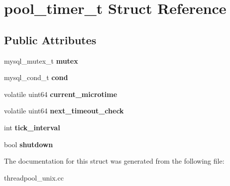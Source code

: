 \hypertarget{structpool__timer__t}{}\section{pool\+\_\+timer\+\_\+t Struct Reference}
\label{structpool__timer__t}
\subsection*{Public Attributes}
\begin{DoxyCompactItemize}
\item 
\mbox{\label{structpool__timer__t_a039774a357f5d3cad96cf047763341d1}} 
mysql\+\_\+mutex\+\_\+t {\bfseries mutex}
\item 
\mbox{\label{structpool__timer__t_ab10360d7d9d2e632e5c32f5cd214855c}} 
mysql\+\_\+cond\+\_\+t {\bfseries cond}
\item 
\mbox{\label{structpool__timer__t_afc1631b7af411289ffcfe05a82974465}} 
volatile uint64 {\bfseries current\+\_\+microtime}
\item 
\mbox{\label{structpool__timer__t_a70327fcc8842fa022200f41470c6ea21}} 
volatile uint64 {\bfseries next\+\_\+timeout\+\_\+check}
\item 
\mbox{\label{structpool__timer__t_aa7471bfac1ba5b2fb7867248c34dc89f}} 
int {\bfseries tick\+\_\+interval}
\item 
\mbox{\label{structpool__timer__t_aa26e836cb86963760684f4e0956b3328}} 
bool {\bfseries shutdown}
\end{DoxyCompactItemize}


The documentation for this struct was generated from the following file\+:\begin{DoxyCompactItemize}
\item 
threadpool\+\_\+unix.\+cc\end{DoxyCompactItemize}
